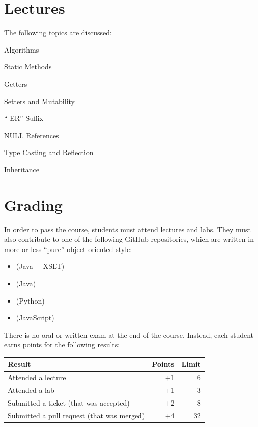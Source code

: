 \documentclass[nobrand,anonymous,nodate,nosecurity]{huawei}
\begin{document}
\newpage
\section*{Lectures}

The following topics are discussed:

\begin{lectures}
\item Algorithms
\item Static Methods
\item Getters
\item Setters and Mutability
\item ``-ER'' Suffix
\item NULL References
\item Type Casting and Reflection
\item Inheritance
\end{lectures}

\newpage
\section*{Grading}

In order to pass the course, students must attend lectures and labs.
They must also contribute to one of the following GitHub repositories, which are written in more or less ``pure'' object-oriented style:

\begin{itemize}
    \item \href{https://github.com/objectionary/eo}{} (Java + XSLT)
    \item \href{https://github.com/yegor256/takes}{} (Java)
    \item \href{https://github.com/cqfn/aibolit}{} (Python)
    \item \href{https://github.com/objectionary/eoc}{} (JavaScript)
\end{itemize}

There is no oral or written exam at the end of the course.
Instead, each student earns points for the following results:

\renewcommand{\arraystretch}{1}
\begin{tabular}{lrr}
\toprule
Result & Points & Limit \\
\midrule
Attended a lecture & +1 & 6 \\
Attended a lab & +1 & 3 \\
Submitted a ticket (that was accepted) & +2 & 8 \\
Submitted a pull request (that was merged) & +4 & 32 \\
\bottomrule
\end{tabular}
\end{document}
